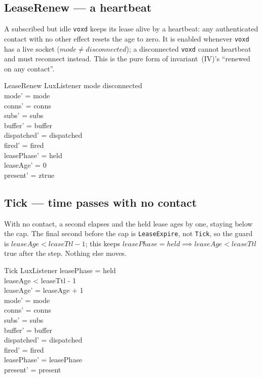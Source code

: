 \documentclass[a4paper,10pt,fleqn]{article}
\begin{document}
\subsection{LeaseRenew --- a heartbeat}

A subscribed but idle \texttt{voxd} keeps its lease alive by a heartbeat: any
authenticated contact with no other effect resets the age to zero. It is enabled
whenever \texttt{voxd} has a live socket ($mode \neq disconnected$); a
disconnected \texttt{voxd} cannot heartbeat and must reconnect instead. This is
the pure form of invariant~(IV)'s ``renewed on any contact''.

\begin{schema}{LeaseRenew}
  \Delta LuxListener
  \where
  mode \neq disconnected \\
  mode' = mode \\
  conns' = conns \\
  subs' = subs \\
  buffer' = buffer \\
  dispatched' = dispatched \\
  fired' = fired \\
  leasePhase' = held \\
  leaseAge' = 0 \\
  present' = ztrue
\end{schema}

\subsection{Tick --- time passes with no contact}

With no contact, a second elapses and the held lease ages by one, staying below
the cap. The final second before the cap is \texttt{LeaseExpire}, not
\texttt{Tick}, so the guard is $leaseAge < leaseTtl - 1$; this keeps
$leasePhase = held \implies leaseAge < leaseTtl$ true after the step. Nothing
else moves.

\begin{schema}{Tick}
  \Delta LuxListener
  \where
  leasePhase = held \\
  leaseAge < leaseTtl - 1 \\
  leaseAge' = leaseAge + 1 \\
  mode' = mode \\
  conns' = conns \\
  subs' = subs \\
  buffer' = buffer \\
  dispatched' = dispatched \\
  fired' = fired \\
  leasePhase' = leasePhase \\
  present' = present
\end{schema}
\end{document}
